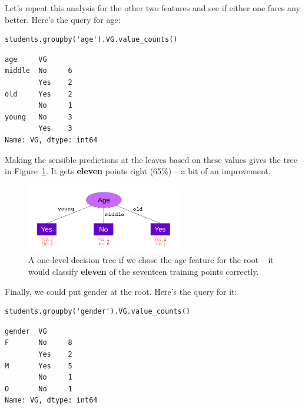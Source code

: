 Let's repeat this analysis for the other two features and see if either one
fares any better. Here's the query for \textsf{age}:

\begin{Verbatim}[fontsize=\small,samepage=true,frame=single,framesep=3mm]
students.groupby('age').VG.value_counts()
\end{Verbatim}
\vspace{-.2in}

\begin{Verbatim}[fontsize=\small,samepage=true,frame=leftline,framesep=5mm,framerule=1mm]
age     VG 
middle  No     6
        Yes    2
old     Yes    2
        No     1
young   No     3
        Yes    3
Name: VG, dtype: int64
\end{Verbatim}

Making the sensible predictions at the leaves based on these values gives the
tree in Figure~\ref{fig:ageOnTop}. It gets \textbf{eleven} points right (65\%)
-- a bit of an improvement.

\begin{figure}[ht]
\centering
\includegraphics[width=0.6\textwidth]{ageOnTop.png}
\caption{A one-level decision tree if we chose the \textsf{age} feature for the
root -- it would classify \textbf{eleven} of the seventeen training points
correctly.}
\label{fig:ageOnTop}
\end{figure}

Finally, we could put \textsf{gender} at the root. Here's the query for it:

\begin{samepage}
\begin{Verbatim}[fontsize=\small,samepage=true,frame=single,framesep=3mm]
students.groupby('gender').VG.value_counts()
\end{Verbatim}
\vspace{-.2in}

\begin{Verbatim}[fontsize=\small,samepage=true,frame=leftline,framesep=5mm,framerule=1mm]
gender  VG 
F       No     8
        Yes    2
M       Yes    5
        No     1
O       No     1
Name: VG, dtype: int64
\end{Verbatim}
\end{samepage}

